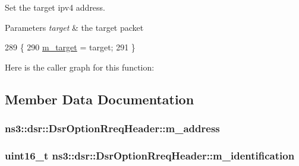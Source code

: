 Set the target ipv4 address. 


\begin{DoxyParams}{Parameters}
{\em target} & the target packet \\
\hline
\end{DoxyParams}

\begin{DoxyCode}
289 \{
290   \hyperlink{classns3_1_1dsr_1_1DsrOptionRreqHeader_a19bba241260fbfda8df02ee3e74ff4ff}{m\_target} = target;
291 \}
\end{DoxyCode}


Here is the caller graph for this function\+:




\subsection{Member Data Documentation}
\subsubsection[{\texorpdfstring{m\+\_\+address}{m_address}}]{ ns3\+::dsr\+::\+Dsr\+Option\+Rreq\+Header\+::m\+\_\+address\hspace{0.3cm}{\ttfamily [private]}}\hypertarget{classns3_1_1dsr_1_1DsrOptionRreqHeader_a274e289fe5886379d6a33bc5f28f683f}{}\label{classns3_1_1dsr_1_1DsrOptionRreqHeader_a274e289fe5886379d6a33bc5f28f683f}
\subsubsection[{\texorpdfstring{m\+\_\+identification}{m_identification}}]{\setlength{\rightskip}{0pt plus 5cm}uint16\+\_\+t ns3\+::dsr\+::\+Dsr\+Option\+Rreq\+Header\+::m\+\_\+identification\hspace{0.3cm}{\ttfamily [private]}}\hypertarget{classns3_1_1dsr_1_1DsrOptionRreqHeader_a807a833e56f4730ce76b21843bde6858}{}\label{classns3_1_1dsr_1_1DsrOptionRreqHeader_a807a833e56f4730ce76b21843bde6858}


